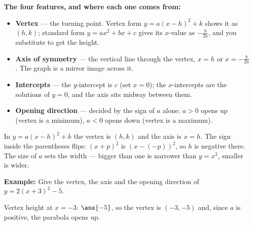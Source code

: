 \documentclass[12pt]{article}
\begin{document}

\begin{formulabox}
\textbf{The four features, and where each one comes from:}
\begin{itemize}[leftmargin=1.1cm, itemsep=1pt, topsep=2pt]
\item \textbf{Vertex} --- the turning point. Vertex form $y = a(x-h)^2 + k$
shows it as $(h,k)$; standard form $y = ax^2 + bx + c$ gives its $x$-value as
$-\frac{b}{2a}$, and you substitute to get the height.
\item \textbf{Axis of symmetry} --- the vertical line through the vertex,
$x = h$ or $x = -\frac{b}{2a}$. The graph is a mirror image across it.
\item \textbf{Intercepts} --- the $y$-intercept is $c$ (set $x = 0$); the
$x$-intercepts are the solutions of $y = 0$, and the axis sits midway between
them.
\item \textbf{Opening direction} --- decided by the sign of $a$ alone:
$a > 0$ opens up (vertex is a minimum), $a < 0$ opens down (vertex is a
maximum).
\end{itemize}
\end{formulabox}


\begin{formulabox}
In $y = a(x-h)^2 + k$ the vertex is $(h,k)$ and the axis is $x = h$. The sign
inside the parentheses flips: $(x+p)^2$ is $(x-(-p))^2$, so $h$ is negative
there. The size of $a$ sets the width --- bigger than one is narrower than
$y = x^2$, smaller is wider.
\end{formulabox}

\begin{examplebox}
\textbf{Example:} Give the vertex, the axis and the opening direction of
$y = 2(x+3)^2 - 5$.
\begin{center}
\end{center}
Vertex height at $x = -3$: $\ans{-5}$, so the vertex is $(-3,-5)$ and, since
$a$ is positive, the parabola opens up.
\end{examplebox}
\end{document}
